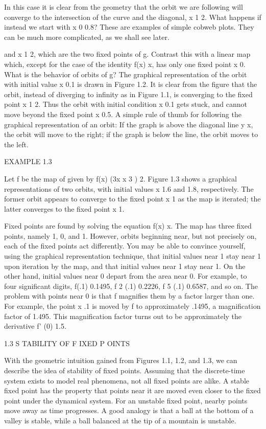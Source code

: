 \documentclass[12pt]{article}
\begin{document}
In this case it is clear from the geometry that the orbit we are following will converge to the 
intersection of the curve and the diagonal, x  1  2. What happens if instead we start with x 0  0.8? These 
are examples of simple cobweb plots. They can be much more complicated, as we shall see later.

and x  1  2, which are the two ﬁxed points of g. Contrast this with a linear map which, except for the 
case of the identity f(x)  x, has only one ﬁxed point x  0. What is the behavior of orbits of g? The 
graphical representation of the orbit with initial value x  0.1 is drawn in Figure 1.2. It is clear from 
the ﬁgure that the orbit, instead of diverging to inﬁnity as in Figure 1.1, is converging to the ﬁxed 
point x  1  2. Thus the orbit with initial condition x  0.1 gets stuck, and cannot move beyond the ﬁxed 
point x  0.5. A simple rule of thumb for following the graphical representation of an orbit: If the graph 
is above the diagonal line y  x, the orbit will move to the right; if the graph is below the line, the 
orbit moves to the left.

EXAMPLE 1.3

Let f be the map of given by f(x)  (3x  x 3 )  2. Figure 1.3 shows a graphical representations of two 
orbits, with initial values x  1.6 and 1.8, respectively. The former orbit appears to converge to the ﬁxed 
point x  1 as the map is iterated; the latter converges to the ﬁxed point x  1.

Fixed points are found by solving the equation f(x)  x. The map has three ﬁxed points, namely 1, 0, and 1. 
However, orbits beginning near, but not precisely on, each of the ﬁxed points act differently. You may be 
able to convince yourself, using the graphical representation technique, that initial values near 1 stay 
near 1 upon iteration by the map, and that initial values near 1 stay near 1. On the other hand, initial 
values near 0 depart from the area near 0. For example, to four signiﬁcant digits, f(.1)  0.1495, f 2 (.1)  
0.2226, f 5 (.1)  0.6587, and so on. The problem with points near 0 is that f magniﬁes them by a factor 
larger than one. For example, the point x  .1 is moved by f to approximately .1495, a magniﬁcation factor 
of 1.495. This magniﬁcation factor turns out to be approximately the derivative f' (0)  1.5.

1.3 S TABILITY OF F IXED P OINTS

With the geometric intuition gained from Figures 1.1, 1.2, and 1.3, we can describe the idea of stability 
of ﬁxed points. Assuming that the discrete-time system exists to model real phenomena, not all ﬁxed 
points are alike. A stable ﬁxed point has the property that points near it are moved even closer to the 
ﬁxed point under the dynamical system. For an unstable ﬁxed point, nearby points move away as time 
progresses. A good analogy is that a ball at the bottom of a valley is stable, while a ball balanced at the 
tip of a mountain is unstable.
\end{document}
